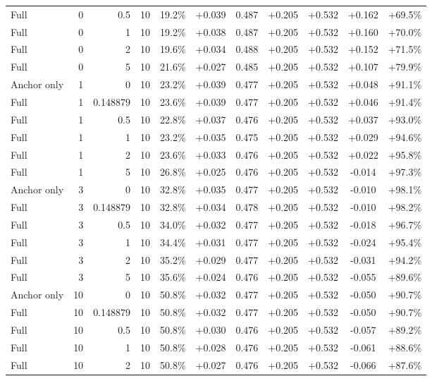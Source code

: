 \begin{table}[htbp]
\begin{tabular}{lrrrccccccc}
Full & 0 & 0.5 & 10 & 19.2\% & +0.039 & 0.487 & +0.205 & +0.532 & +0.162 & +69.5\% \\
Full & 0 & 1 & 10 & 19.2\% & +0.038 & 0.487 & +0.205 & +0.532 & +0.160 & +70.0\% \\
Full & 0 & 2 & 10 & 19.6\% & +0.034 & 0.488 & +0.205 & +0.532 & +0.152 & +71.5\% \\
Full & 0 & 5 & 10 & 21.6\% & +0.027 & 0.485 & +0.205 & +0.532 & +0.107 & +79.9\% \\
Anchor only & 1 & 0 & 10 & 23.2\% & +0.039 & 0.477 & +0.205 & +0.532 & +0.048 & +91.1\% \\
Full & 1 & 0.148879 & 10 & 23.6\% & +0.039 & 0.477 & +0.205 & +0.532 & +0.046 & +91.4\% \\
Full & 1 & 0.5 & 10 & 22.8\% & +0.037 & 0.476 & +0.205 & +0.532 & +0.037 & +93.0\% \\
Full & 1 & 1 & 10 & 23.2\% & +0.035 & 0.475 & +0.205 & +0.532 & +0.029 & +94.6\% \\
Full & 1 & 2 & 10 & 23.6\% & +0.033 & 0.476 & +0.205 & +0.532 & +0.022 & +95.8\% \\
Full & 1 & 5 & 10 & 26.8\% & +0.025 & 0.476 & +0.205 & +0.532 & -0.014 & +97.3\% \\
Anchor only & 3 & 0 & 10 & 32.8\% & +0.035 & 0.477 & +0.205 & +0.532 & -0.010 & +98.1\% \\
Full & 3 & 0.148879 & 10 & 32.8\% & +0.034 & 0.478 & +0.205 & +0.532 & -0.010 & +98.2\% \\
Full & 3 & 0.5 & 10 & 34.0\% & +0.032 & 0.477 & +0.205 & +0.532 & -0.018 & +96.7\% \\
Full & 3 & 1 & 10 & 34.4\% & +0.031 & 0.477 & +0.205 & +0.532 & -0.024 & +95.4\% \\
Full & 3 & 2 & 10 & 35.2\% & +0.029 & 0.477 & +0.205 & +0.532 & -0.031 & +94.2\% \\
Full & 3 & 5 & 10 & 35.6\% & +0.024 & 0.476 & +0.205 & +0.532 & -0.055 & +89.6\% \\
Anchor only & 10 & 0 & 10 & 50.8\% & +0.032 & 0.477 & +0.205 & +0.532 & -0.050 & +90.7\% \\
Full & 10 & 0.148879 & 10 & 50.8\% & +0.032 & 0.477 & +0.205 & +0.532 & -0.050 & +90.7\% \\
Full & 10 & 0.5 & 10 & 50.8\% & +0.030 & 0.476 & +0.205 & +0.532 & -0.057 & +89.2\% \\
Full & 10 & 1 & 10 & 50.8\% & +0.028 & 0.476 & +0.205 & +0.532 & -0.061 & +88.6\% \\
Full & 10 & 2 & 10 & 50.8\% & +0.027 & 0.476 & +0.205 & +0.532 & -0.066 & +87.6\% \\

\end{tabular}
\end{table}
